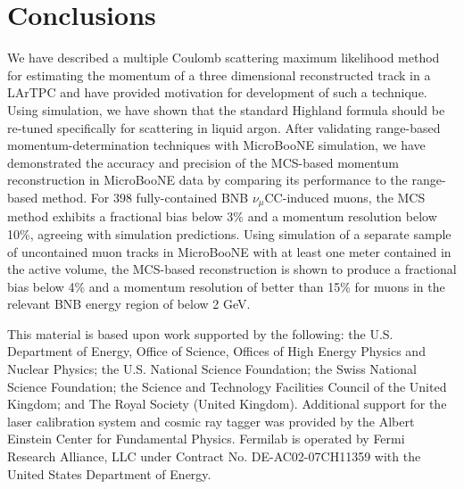 \documentclass[a4paper,11pt]{article}
\begin{document}
\section{Conclusions}
We have described a multiple Coulomb scattering maximum likelihood method for estimating the momentum of a three dimensional reconstructed track in a LArTPC and have provided motivation for development of such a technique. Using simulation, we have shown that the standard Highland formula should be re-tuned specifically for scattering in liquid argon. After validating range-based momentum-determination techniques with MicroBooNE simulation, we have demonstrated the accuracy and precision of the MCS-based momentum reconstruction in MicroBooNE data by comparing its performance to the range-based method. For 398 fully-contained BNB $\nu_\mu$CC-induced muons, the MCS method exhibits a fractional bias below 3\% and a momentum resolution below 10\%, agreeing with simulation predictions. Using simulation of a separate sample of uncontained muon tracks in MicroBooNE with at least one meter contained in the active volume, the MCS-based reconstruction is shown to produce a fractional bias below 4\% and a momentum resolution of better than 15\% for muons in the relevant BNB energy region of below 2 GeV.

\acknowledgments
This material is based upon work supported by the following: the U.S. Department of Energy, Office of Science, Offices of High Energy Physics and Nuclear Physics; the U.S. National Science Foundation; the Swiss National Science Foundation; the Science and Technology Facilities Council of the United Kingdom; and The Royal Society (United Kingdom). Additional support for the laser calibration system and cosmic ray tagger was provided by the Albert Einstein Center for Fundamental Physics. Fermilab is operated by Fermi Research Alliance, LLC under Contract No. DE-AC02-07CH11359 with the United States Department of Energy.
\end{document}
